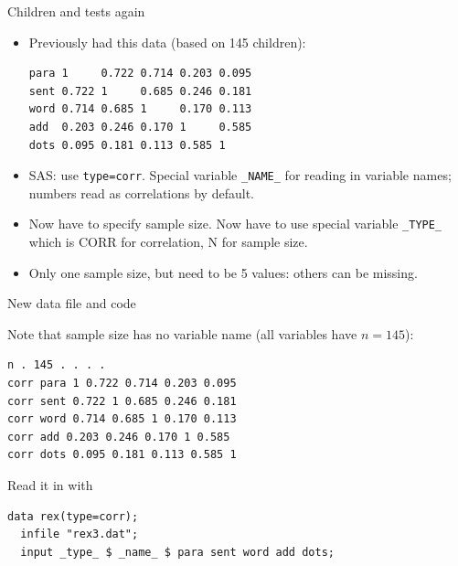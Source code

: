 \documentclass[pdf]{prosper}
\begin{document}
\begin{slide}{Children and tests again}

\begin{itemize}
\item
Previously had this data (based on 145 children):

\begin{verbatim}
para 1     0.722 0.714 0.203 0.095
sent 0.722 1     0.685 0.246 0.181
word 0.714 0.685 1     0.170 0.113
add  0.203 0.246 0.170 1     0.585
dots 0.095 0.181 0.113 0.585 1
\end{verbatim}

\item SAS: use \verb-type=corr-. Special variable \verb-_NAME_- for reading in variable names; numbers read as correlations by default.
\item Now have to specify sample size. Now have to use special variable \verb-_TYPE_- which is CORR for correlation, N for sample size.
\item Only one sample size, but need to be 5 values: others can be missing.

\end{itemize}
\end{slide}

\begin{slide}{New data file and code}

Note that sample size has no variable name (all variables have $n=145$):

\begin{verbatim}
n . 145 . . . .  
corr para 1 0.722 0.714 0.203 0.095 
corr sent 0.722 1 0.685 0.246 0.181 
corr word 0.714 0.685 1 0.170 0.113 
corr add 0.203 0.246 0.170 1 0.585 
corr dots 0.095 0.181 0.113 0.585 1 
\end{verbatim}

\vspace{3ex}

Read it in with

\begin{verbatim}
data rex(type=corr);
  infile "rex3.dat";
  input _type_ $ _name_ $ para sent word add dots;

\end{verbatim}

  \end{slide}
\end{document}
